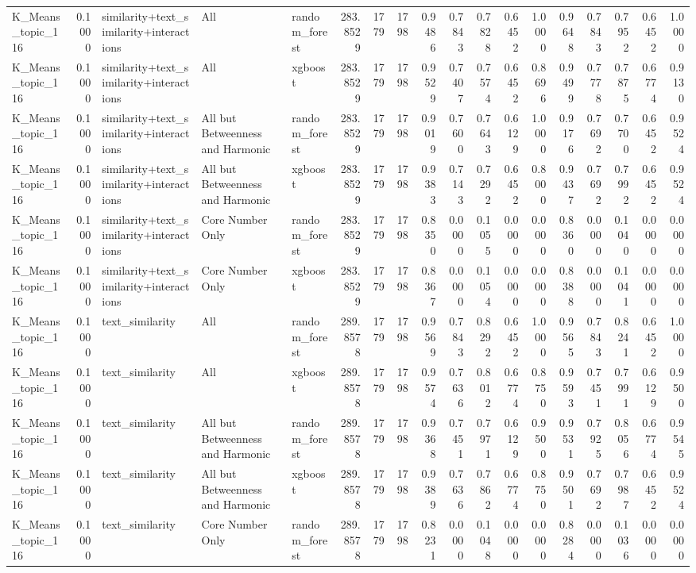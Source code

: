 \begin{tabular}{lrlllrrrrrrrrrrrrr}
K_Means_topic_116 & 0.1000 & similarity+text_similarity+interactions & All & random_forest & 283.8529 & 1779 & 1798 & 0.9486 & 0.7843 & 0.7828 & 0.6452 & 1.0000 & 0.9648 & 0.7843 & 0.7952 & 0.6452 & 1.0000 \\
K_Means_topic_116 & 0.1000 & similarity+text_similarity+interactions & All & xgboost & 283.8529 & 1779 & 1798 & 0.9529 & 0.7407 & 0.7574 & 0.6452 & 0.8696 & 0.9499 & 0.7778 & 0.7875 & 0.6774 & 0.9130 \\
K_Means_topic_116 & 0.1000 & similarity+text_similarity+interactions & All but Betweenness and Harmonic & random_forest & 283.8529 & 1779 & 1798 & 0.9019 & 0.7600 & 0.7643 & 0.6129 & 1.0000 & 0.9176 & 0.7692 & 0.7700 & 0.6452 & 0.9524 \\
K_Means_topic_116 & 0.1000 & similarity+text_similarity+interactions & All but Betweenness and Harmonic & xgboost & 283.8529 & 1779 & 1798 & 0.9383 & 0.7143 & 0.7292 & 0.6452 & 0.8000 & 0.9437 & 0.7692 & 0.7992 & 0.6452 & 0.9524 \\
K_Means_topic_116 & 0.1000 & similarity+text_similarity+interactions & Core Number Only & random_forest & 283.8529 & 1779 & 1798 & 0.8350 & 0.0000 & 0.1055 & 0.0000 & 0.0000 & 0.8360 & 0.0000 & 0.1040 & 0.0000 & 0.0000 \\
K_Means_topic_116 & 0.1000 & similarity+text_similarity+interactions & Core Number Only & xgboost & 283.8529 & 1779 & 1798 & 0.8367 & 0.0000 & 0.1054 & 0.0000 & 0.0000 & 0.8388 & 0.0000 & 0.1041 & 0.0000 & 0.0000 \\
K_Means_topic_116 & 0.1000 & text_similarity & All & random_forest & 289.8578 & 1779 & 1798 & 0.9569 & 0.7843 & 0.8292 & 0.6452 & 1.0000 & 0.9565 & 0.7843 & 0.8241 & 0.6452 & 1.0000 \\
K_Means_topic_116 & 0.1000 & text_similarity & All & xgboost & 289.8578 & 1779 & 1798 & 0.9574 & 0.7636 & 0.8012 & 0.6774 & 0.8750 & 0.9593 & 0.7451 & 0.7991 & 0.6129 & 0.9500 \\
K_Means_topic_116 & 0.1000 & text_similarity & All but Betweenness and Harmonic & random_forest & 289.8578 & 1779 & 1798 & 0.9368 & 0.7451 & 0.7971 & 0.6129 & 0.9500 & 0.9531 & 0.7925 & 0.8056 & 0.6774 & 0.9545 \\
K_Means_topic_116 & 0.1000 & text_similarity & All but Betweenness and Harmonic & xgboost & 289.8578 & 1779 & 1798 & 0.9389 & 0.7636 & 0.7862 & 0.6774 & 0.8750 & 0.9501 & 0.7692 & 0.7987 & 0.6452 & 0.9524 \\
K_Means_topic_116 & 0.1000 & text_similarity & Core Number Only & random_forest & 289.8578 & 1779 & 1798 & 0.8231 & 0.0000 & 0.1048 & 0.0000 & 0.0000 & 0.8284 & 0.0000 & 0.1036 & 0.0000 & 0.0000 \\

\end{tabular}
